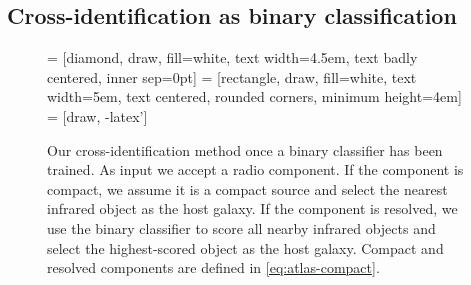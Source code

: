  \subsection{Cross-identification as binary classification}\label{sec:atlas-xid-as-binary-classification}
    \begin{figure}
      \centering
       = [diamond, draw, fill=white,
          text width=4.5em, text badly centered, inner sep=0pt]
       = [rectangle, draw, fill=white,
          text width=5em, text centered, rounded corners, minimum height=4em]
       = [draw, -latex']
      \caption[Our cross-identification method once a binary classifier has been trained.]{{Our cross-identification method once a binary classifier has been trained}. As
        input we accept a radio {component. If the component is compact, we assume it is a compact source and select
        the nearest infrared object as the host galaxy. If the component is
        resolved, we use the binary classifier to score all nearby infrared objects
        and select the highest-scored object as the host galaxy. Compact and resolved components are defined in \autoref{eq:atlas-compact}.}}
      \label{fig:flowchart}
    \end{figure}

